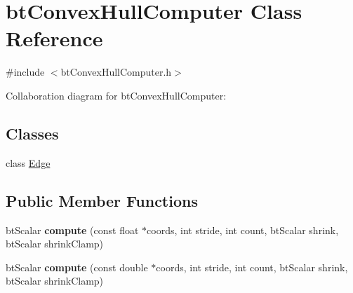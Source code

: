 \hypertarget{classbt_convex_hull_computer}{\section{bt\+Convex\+Hull\+Computer Class Reference}
\label{classbt_convex_hull_computer}
}


{\ttfamily \#include $<$bt\+Convex\+Hull\+Computer.\+h$>$}



Collaboration diagram for bt\+Convex\+Hull\+Computer\+:
\subsection*{Classes}
\begin{DoxyCompactItemize}
\item 
class \hyperlink{classbt_convex_hull_computer_1_1_edge}{Edge}
\end{DoxyCompactItemize}
\subsection*{Public Member Functions}
\begin{DoxyCompactItemize}
\item 
\hypertarget{classbt_convex_hull_computer_aee4950eb396c47742806720b0795ef54}{bt\+Scalar {\bfseries compute} (const float $\ast$coords, int stride, int count, bt\+Scalar shrink, bt\+Scalar shrink\+Clamp)}\label{classbt_convex_hull_computer_aee4950eb396c47742806720b0795ef54}

\item 
\hypertarget{classbt_convex_hull_computer_aa1a88c8d625dbd098e2eba2398fffe90}{bt\+Scalar {\bfseries compute} (const double $\ast$coords, int stride, int count, bt\+Scalar shrink, bt\+Scalar shrink\+Clamp)}\label{classbt_convex_hull_computer_aa1a88c8d625dbd098e2eba2398fffe90}

\end{DoxyCompactItemize}

